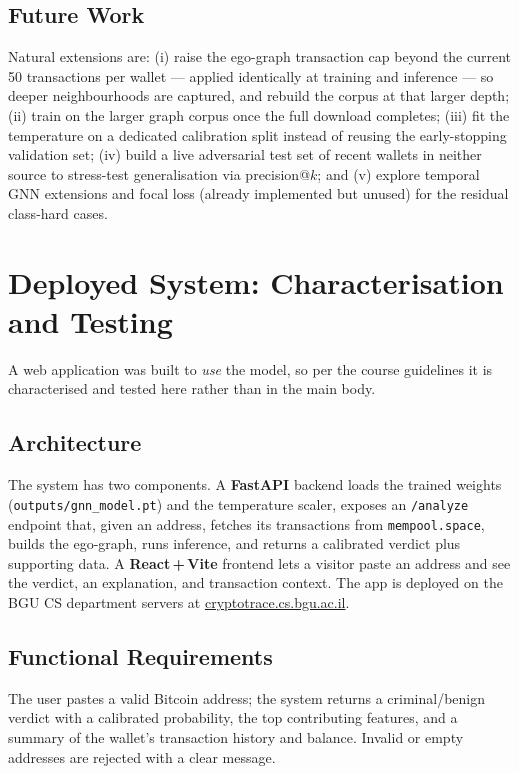 \documentclass[12pt,a4paper,openany]{report}
\newcommand{\live}{\href{https://cryptotrace.cs.bgu.ac.il/}{cryptotrace.cs.bgu.ac.il}}
\begin{document}
\section{Future Work}
Natural extensions are: (i) raise the ego-graph transaction cap beyond the current 50 transactions
per wallet --- applied identically at training and inference --- so deeper neighbourhoods are
captured, and rebuild the corpus at that larger depth; (ii) train on the larger graph corpus once
the full download completes; (iii) fit the temperature on a dedicated calibration split instead of
reusing the early-stopping validation set; (iv) build a live adversarial test set of recent wallets in neither source to stress-test
generalisation via precision@$k$; and (v) explore temporal GNN extensions and focal loss (already
implemented but unused) for the residual class-hard cases.




\appendix
\chapter{Deployed System: Characterisation and Testing}\label{app:system}
A web application was built to \emph{use} the model, so per the course guidelines it is
characterised and tested here rather than in the main body.

\section{Architecture}
The system has two components. A \textbf{FastAPI} backend loads the trained weights
(\texttt{outputs/gnn\_model.pt}) and the temperature scaler, exposes an \texttt{/analyze}
endpoint that, given an address, fetches its transactions from \texttt{mempool.space}, builds
the ego-graph, runs inference, and returns a calibrated verdict plus supporting data. A
\textbf{React\,+\,Vite} frontend lets a visitor paste an address and see the verdict, an
explanation, and transaction context. The app is deployed on the BGU CS department servers at
\live.

\section{Functional Requirements}
The user pastes a valid Bitcoin address; the system returns a criminal/benign verdict with a
calibrated probability, the top contributing features, and a summary of the wallet's transaction
history and balance. Invalid or empty addresses are rejected with a clear message.
\end{document}
